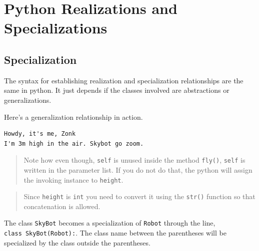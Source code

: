 \section{Python Realizations and
Specializations}\label{oopython.md__python-realizations-and-specializations}

\subsection{Specialization}\label{oopython.md__specialization}

The syntax for establishing realization and specialization relationships
are the same in python. It just depends if the classes involved are
abstractions or generalizations.

Here's a generalization relationship in action.

\begin{Shaded}
\begin{Highlighting}[]
    \NormalTok{):}
        \NormalTok{(}\OperatorTok{+} \OperatorTok{+}\NormalTok{)}

\OperatorTok{=}\NormalTok{)}
\NormalTok{)}
\end{Highlighting}
\end{Shaded}

\begin{verbatim}
Howdy, it's me, Zonk
I'm 3m high in the air. Skybot go zoom.
\end{verbatim}

\begin{quote}
Note how even though, \texttt{self} is unused inside the method
\texttt{fly()}, \texttt{self} is written in the parameter list. If you
do not do that, the python will assign the invoking instance to
\texttt{height}.
\end{quote}

\begin{quote}
Since \texttt{height} is \texttt{int} you need to convert it using the
\texttt{str()} function so that concatenation is allowed.
\end{quote}

The class \texttt{SkyBot} becomes a specialization of \texttt{Robot}
through the line, \texttt{class\ SkyBot(Robot):}. The class name between
the parentheses will be specialized by the class outside the
parentheses.

